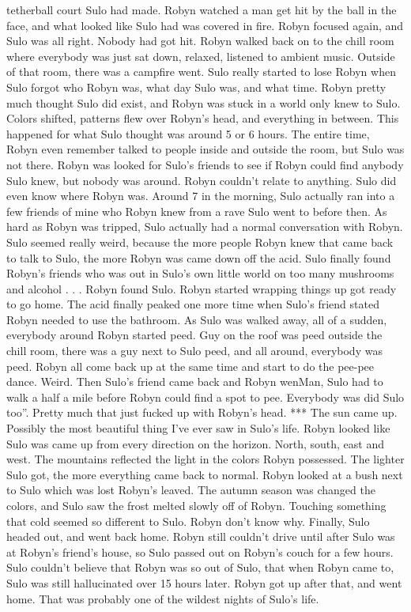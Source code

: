 \documentclass[12pt]{book}
\begin{document}
tetherball court Sulo had made. Robyn watched a man get hit by the ball in the face, and what looked like Sulo had was covered in fire. Robyn focused again, and Sulo was all right. Nobody had got hit. Robyn walked back on to the chill room where everybody was just sat down, relaxed, listened to ambient music. Outside of that room, there was a campfire went. Sulo really started to lose Robyn when Sulo forgot who Robyn was, what day Sulo was, and what time. Robyn pretty much thought Sulo did exist, and Robyn was stuck in a world only knew to Sulo. Colors shifted, patterns flew over Robyn's head, and everything in between. This happened for what Sulo thought was around 5 or 6 hours. The entire time, Robyn even remember talked to people inside and outside the room, but Sulo was not there. Robyn was looked for Sulo's friends to see if Robyn could find anybody Sulo knew, but nobody was around. Robyn couldn't relate to anything. Sulo did even know where Robyn was. Around 7 in the morning, Sulo actually ran into a few friends of mine who Robyn knew from a rave Sulo went to before then. As hard as Robyn was tripped, Sulo actually had a normal conversation with Robyn. Sulo seemed really weird, because the more people Robyn knew that came back to talk to Sulo, the more Robyn was came down off the acid. Sulo finally found Robyn's friends who was out in Sulo's own little world on too many mushrooms and alcohol . . .  Robyn found Sulo. Robyn started wrapping things up got ready to go home. The acid finally peaked one more time when Sulo's friend stated Robyn needed to use the bathroom. As Sulo was walked away, all of a sudden, everybody around Robyn started peed. Guy on the roof was peed outside the chill room, there was a guy next to Sulo peed, and all around, everybody was peed. Robyn all come back up at the same time and start to do the pee-pee dance. Weird. Then Sulo's friend came back and Robyn wenMan, Sulo had to walk a half a mile before Robyn could find a spot to pee. Everybody was did Sulo too''. Pretty much that just fucked up with Robyn's head. *** The sun came up. Possibly the most beautiful thing I've ever saw in Sulo's life. Robyn looked like Sulo was came up from every direction on the horizon. North, south, east and west. The mountains reflected the light in the colors Robyn possessed. The lighter Sulo got, the more everything came back to normal. Robyn looked at a bush next to Sulo which was lost Robyn's leaved. The autumn season was changed the colors, and Sulo saw the frost melted slowly off of Robyn. Touching something that cold seemed so different to Sulo. Robyn don't know why. Finally, Sulo headed out, and went back home. Robyn still couldn't drive until after Sulo was at Robyn's friend's house, so Sulo passed out on Robyn's couch for a few hours. Sulo couldn't believe that Robyn was so out of Sulo, that when Robyn came to, Sulo was still hallucinated over 15 hours later. Robyn got up after that, and went home. That was probably one of the wildest nights of Sulo's life.
\end{document}
